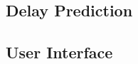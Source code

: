 \documentclass[11pt]{article}
\begin{document}
\subsection{Delay Prediction} \label{delay-prediction-design}


\subsection{User Interface} \label{user-interface-design}



 
% 
% 
% 
% 
% 
% 
% 
\end{document}
